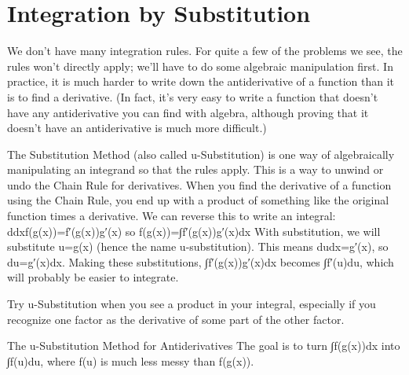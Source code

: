 \section{Integration by Substitution}
\label{sec:substitution}
We don't have many integration rules. For quite a few of the problems we see, the rules won't directly apply; we'll have to do some algebraic manipulation first. In practice, it is much harder to write down the antiderivative of a function than it is to find a derivative. (In fact, it's very easy to write a function that doesn't have any antiderivative you can find with algebra, although proving that it doesn't have an antiderivative is much more difficult.)

The Substitution Method (also called u-Substitution) is one way of algebraically manipulating an integrand so that the rules apply. This is a way to unwind or undo the Chain Rule for derivatives. When you find the derivative of a function using the Chain Rule, you end up with a product of something like the original function times a derivative. We can reverse this to write an integral:
ddxf(g(x))=f′(g(x))g′(x)
so
f(g(x))=∫f′(g(x))g′(x)dx
With substitution, we will substitute u=g(x) (hence the name u-substitution). This means dudx=g′(x), so du=g′(x)dx. Making these substitutions, ∫f′(g(x))g′(x)dx becomes ∫f′(u)du, which will probably be easier to integrate.

Try u-Substitution when you see a product in your integral, especially if you recognize one factor as the derivative of some part of the other factor.

The u-Substitution Method for Antiderivatives
The goal is to turn ∫f(g(x))dx into ∫f(u)du, where f(u) is much less messy than f(g(x)).

